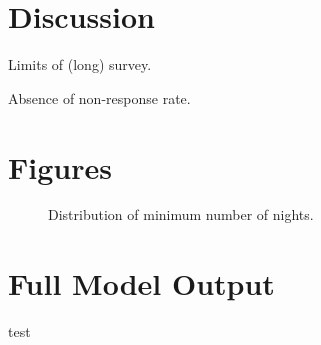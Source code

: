 \documentclass[10pt]{jmlr}%
\begin{document}
\section{Discussion}
\label{sec:conclusion}

Limits of (long) survey.

Absence of non-response rate.


\newpage
\appendix

\section{Figures}
\label{appendix:fig}

\begin{figure}[htbp]
	\centering
	\caption{Distribution of minimum number of nights.}
	\label{fig:length_stay_density}
\end{figure}


\newpage  %


\section{Full Model Output}

	test

\newpage


\end{document}

